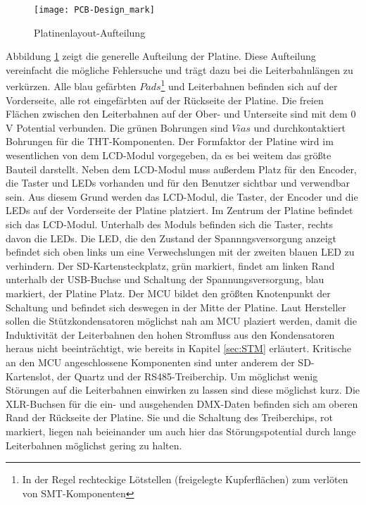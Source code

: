 \begin{figure}[h]
	\begin{center}
		\texttt{[image: PCB-Design\_mark]}
		\caption{Platinenlayout-Aufteilung}
		\label{fig:PCB-Layout}
	\end{center}
\end{figure}
Abbildung \ref{fig:PCB-Layout} zeigt die generelle Aufteilung der Platine. Diese Aufteilung vereinfacht die mögliche Fehlersuche und trägt dazu bei die Leiterbahnlängen zu verkürzen. Alle blau gefärbten $Pads$\footnote{In der Regel rechteckige Lötstellen (freigelegte Kupferflächen) zum verlöten von SMT-Komponenten} und Leiterbahnen befinden sich auf der Vorderseite, alle rot eingefärbten auf der Rückseite der Platine. Die freien Flächen zwischen den Leiterbahnen auf der Ober- und Unterseite sind mit dem 0\,V Potential verbunden. Die grünen Bohrungen sind $Vias$ und durchkontaktiert Bohrungen für die THT-Komponenten.
Der Formfaktor der Platine wird im wesentlichen von dem LCD-Modul vorgegeben, da es bei weitem das größte Bauteil darstellt. Neben dem LCD-Modul muss außerdem Platz für den Encoder, die Taster und LEDs vorhanden und für den Benutzer sichtbar und verwendbar sein. Aus diesem Grund werden das LCD-Modul, die Taster, der Encoder und die LEDs auf der Vorderseite der Platine platziert. Im Zentrum der Platine befindet sich das LCD-Modul. Unterhalb des Moduls befinden sich die Taster, rechts davon die LEDs. Die LED, die den Zustand der Spannngsversorgung anzeigt befindet sich oben links um eine Verwechslungen mit der zweiten blauen LED zu verhindern. Der SD-Kartensteckplatz, grün markiert, findet am linken Rand unterhalb der USB-Buchse und Schaltung der Spannungsversorgung, blau markiert, der Platine Platz. Der MCU bildet den größten Knotenpunkt der Schaltung und befindet sich deswegen in der Mitte der Platine. Laut Hersteller sollen die Stützkondensatoren möglichst nah am MCU plaziert werden, damit die Induktivität der Leiterbahnen den hohen Stromfluss aus den Kondensatoren heraus nicht beeinträchtigt, wie bereits in Kapitel \ref{sec:STM} erläutert. Kritische an den MCU angeschlossene Komponenten sind unter anderem der SD-Kartenslot, der Quartz und der RS485-Treiberchip. Um möglichst wenig Störungen auf die Leiterbahnen einwirken zu lassen sind diese möglichst kurz. Die XLR-Buchsen für die ein- und ausgehenden DMX-Daten befinden sich am oberen Rand der Rückseite der Platine. Sie und die Schaltung des Treiberchips, rot markiert, liegen nah beieinander um auch hier das Störungspotential durch lange Leiterbahnen möglichst gering zu halten.